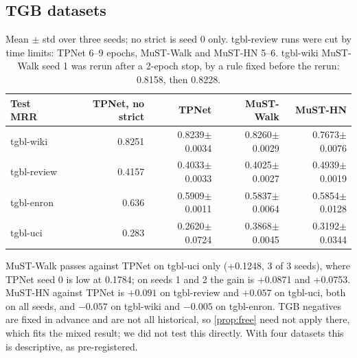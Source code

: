 \documentclass[11pt,a4paper]{article}
\theoremstyle{plain}
\theoremstyle{definition}
\begin{document}
\subsection{TGB datasets}
\begin{table}[H]\centering\small
\begin{tabular}{lrrrr}
\toprule
Test MRR & TPNet, no strict & TPNet & MuST-Walk & MuST-HN\\
\midrule
tgbl-wiki & 0.8251 & 0.8239$\pm$0.0034 & 0.8260$\pm$0.0029 & 0.7673$\pm$0.0076\\
tgbl-review & 0.4157 & 0.4033$\pm$0.0033 & 0.4025$\pm$0.0027 & 0.4939$\pm$0.0019\\
tgbl-enron & 0.636 & 0.5909$\pm$0.0011 & 0.5837$\pm$0.0064 & 0.5854$\pm$0.0128\\
tgbl-uci & 0.283 & 0.2620$\pm$0.0724 & 0.3868$\pm$0.0045 & 0.3192$\pm$0.0344\\
\bottomrule
\end{tabular}
\caption{Mean $\pm$ std over three seeds; no strict is seed 0 only. tgbl-review runs were cut by time limits: TPNet 6--9 epochs, MuST-Walk and MuST-HN 5--6. tgbl-wiki MuST-Walk seed 1 was rerun after a 2-epoch stop, by a rule fixed before the rerun: 0.8158, then 0.8228.}\label{tab:tgb}
\end{table}
MuST-Walk passes against TPNet on tgbl-uci only (+0.1248, 3 of 3 seeds), where TPNet seed 0 is low at 0.1784; on seeds 1 and 2 the gain is +0.0871 and +0.0753. MuST-HN against TPNet is $+0.091$ on tgbl-review and $+0.057$ on tgbl-uci, both on all seeds, and $-0.057$ on tgbl-wiki and $-0.005$ on tgbl-enron. TGB negatives are fixed in advance and are not all historical, so \cref{prop:free} need not apply there, which fits the mixed result; we did not test this directly. With four datasets this is descriptive, as pre-registered.
\end{document}

